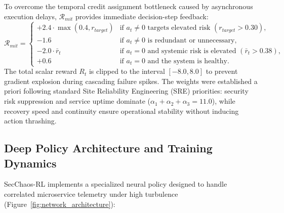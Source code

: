 \documentclass[ASNA,twocolumn]{USG}
\begin{document}
To overcome the temporal credit assignment bottleneck caused by asynchronous execution delays, $\mathcal{R}_{mit}$ provides immediate decision-step feedback:
\begin{equation}
    \mathcal{R}_{mit} = \begin{cases}
        +2.4 \cdot \max(0.4, r_{target}) & \text{if } a_t \neq 0 \text{ targets elevated risk } (r_{target} > 0.30), \\
        -1.6 & \text{if } a_t \neq 0 \text{ is redundant or unnecessary}, \\
        -2.0 \cdot \bar{r}_t & \text{if } a_t = 0 \text{ and systemic risk is elevated } (\bar{r}_t > 0.38), \\
        +0.6 & \text{if } a_t = 0 \text{ and the system is healthy.}
    \end{cases}
\end{equation}
The total scalar reward $R_t$ is clipped to the interval $[-8.0, 8.0]$ to prevent gradient explosion during cascading failure spikes. The weights were established a priori following standard Site Reliability Engineering (SRE) priorities: security risk suppression and service uptime dominate ($\alpha_1 + \alpha_2 + \alpha_3 = 11.0$), while recovery speed and continuity ensure operational stability without inducing action thrashing.

\subsection{Deep Policy Architecture and Training Dynamics}
SecChaos-RL implements a specialized neural policy designed to handle correlated microservice telemetry under high turbulence (Figure~\ref{fig:network_architecture}):
\end{document}
